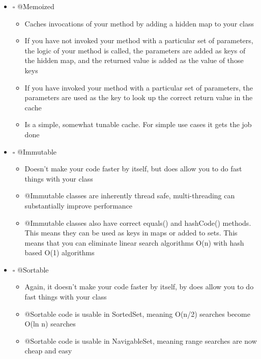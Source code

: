 \documentclass[11pt]{article}
\begin{document}
\begin{itemize}
\item $\square$ @Memoized

\begin{itemize}
\item Caches invocations of your method by adding a hidden map to your class

\item If you have not invoked your method with a particular set of parameters, the logic of your method is called, the parameters are added as keys of the hidden map, and the returned value is added as the value of those keys

\item If you have invoked your method with a particular set of parameters, the parameters are used as the key to look up the correct return value in the cache

\item Is a simple, somewhat tunable cache. For simple use cases it gets the job done
\end{itemize}

\item $\square$ @Immutable

\begin{itemize}
\item Doesn't make your code faster by itself, but does allow you to do fast things with your class

\item @Immutable classes are inherently thread safe, multi-threading can substantially improve performance

\item @Immutable classes also have correct equals() and hashCode() methods. This means they can be used as keys in maps or added to sets. This means that you can eliminate linear search algorithms O(n) with hash based O(1) algorithms
\end{itemize}

\item $\square$ @Sortable

\begin{itemize}
\item Again, it doesn't make your code faster by itself, by does allow you to do fast things with your class

\item @Sortable code is usable in SortedSet, meaning O(n/2) searches become O(ln n) searches

\item @Sortable code is usable in NavigableSet, meaning range searches are now cheap and easy
\end{itemize}


\end{itemize}
\end{document}
